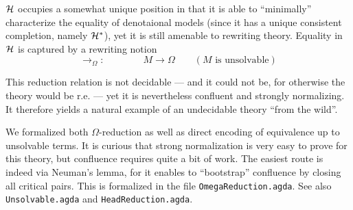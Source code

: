 $\mathcal{H}$ occupies a somewhat unique position in that it is able to ``minimally'' characterize the equality of denotaional models (since it has a unique consistent completion, namely $\mathcal{H}^*$), yet it is still amenable to rewriting theory. Equality in $\mathcal{H}$ is captured by a rewriting notion 
\[ \longrightarrow_\Omega: \qquad \qquad M \longrightarrow \Omega \quad \quad (M \text{ is unsolvable}) \]

This reduction relation is not decidable --- and it could not be, for otherwise the theory would be r.e. --- yet it is nevertheless confluent and strongly normalizing.
It therefore yields a natural example of an undecidable theory ``from the wild''.

We formalized both $\Omega$-reduction as well as direct encoding of equivalence up to unsolvable terms.  It is curious that strong normalization is very easy to prove for this theory, but confluence requires quite a bit of work.  The easiest route is indeed via Neuman's lemma, for it enables to ``bootstrap'' confluence by closing all critical pairs. This is formalized in the file \verb|OmegaReduction.agda|.  See also \verb|Unsolvable.agda| and \verb|HeadReduction.agda|.
